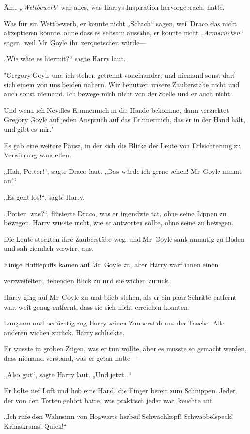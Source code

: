 {Äh… „\emph{Wettbewerb}" war alles, was Harrys Inspiration hervorgebracht hatte.

Was für ein Wettbewerb, er konnte nicht „Schach“ sagen, weil Draco das nicht akzeptieren könnte, ohne dass es seltsam aussähe, er konnte nicht „\emph{Armdrücken}“ sagen, weil Mr~Goyle ihn zerquetschen würde—

„Wie wäre es hiermit?“ sagte Harry laut.

"Gregory Goyle und ich stehen getrennt voneinander, und niemand sonst darf sich einem von uns beiden nähern. Wir benutzen unsere Zauberstäbe nicht und auch sonst niemand. Ich bewege mich nicht von der Stelle und er auch nicht.

Und wenn ich Nevilles Erinnermich in die Hände bekomme, dann verzichtet Gregory Goyle auf jeden Anspruch auf das Erinnermich, das er in der Hand hält, und gibt es mir."

Es gab eine weitere Pause, in der sich die Blicke der Leute von Erleichterung zu Verwirrung wandelten.

„Hah, Potter!“, sagte Draco laut. „Das würde ich gerne sehen! Mr~Goyle nimmt an!“

„Es geht los!“, sagte Harry.

„Potter, was?“, flüsterte Draco, was er irgendwie tat, ohne seine Lippen zu bewegen. Harry wusste nicht, wie er antworten sollte, ohne seine zu bewegen.

Die Leute steckten ihre Zauberstäbe weg, und Mr~Goyle sank anmutig zu Boden und sah ziemlich verwirrt aus.

Einige Hufflepuffs kamen auf Mr~Goyle zu, aber Harry warf ihnen einen

verzweifelten, flehenden Blick zu und sie wichen zurück.

Harry ging auf Mr~Goyle zu und blieb stehen, als er ein paar Schritte entfernt war, weit genug entfernt, dass sie sich nicht erreichen konnten.

Langsam und bedächtig zog Harry seinen Zauberstab aus der Tasche. Alle anderen wichen zurück. Harry schluckte.

Er wusste in groben Zügen, was er tun wollte, aber es musste so gemacht werden, dass niemand verstand, was er getan hatte—

„Also gut“, sagte Harry laut. „Und jetzt…“

Er holte tief Luft und hob eine Hand, die Finger bereit zum Schnippen. Jeder, der von den Torten gehört hatte, was praktisch jeder war, keuchte auf.

„Ich rufe den Wahnsinn von Hogwarts herbei! Schwachkopf! Schwabbelspeck! Krimskrams! Quiek!“

}

